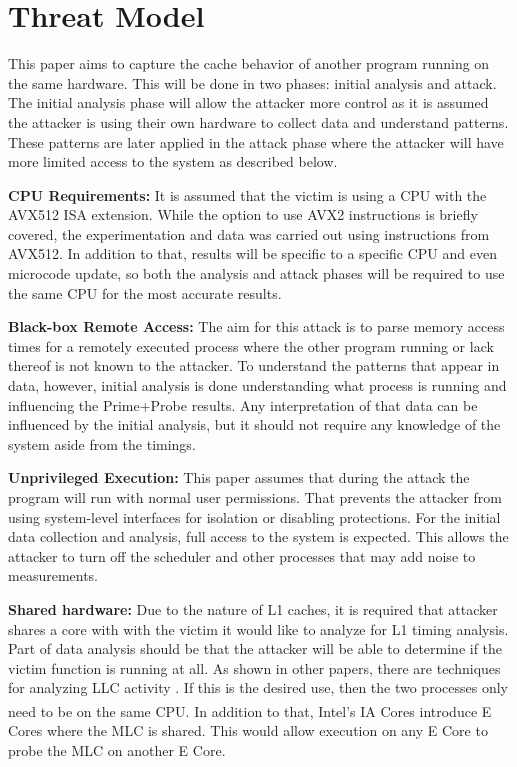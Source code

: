 \documentclass[article]{IEEEtran}
\begin{document}
\section{Threat Model}

This paper aims to capture the cache behavior of another program running on the same hardware. This will be done in two phases: initial analysis and attack. The initial analysis phase will allow the attacker more control as it is assumed the attacker is using their own hardware to collect data and understand patterns. These patterns are later applied in the attack phase where the attacker will have more limited access to the system as described below.

\textbf{CPU Requirements:} It is assumed that the victim is using a CPU with the AVX512 ISA extension. While the option to use AVX2 instructions is briefly covered, the experimentation and data was carried out using instructions from AVX512. In addition to that, results will be specific to a specific CPU and even microcode update, so both the analysis and attack phases will be required to use the same CPU for the most accurate results. 

\textbf{Black-box Remote Access:} The aim for this attack is to parse memory access times for a remotely executed process where the other program running or lack thereof is not known to the attacker. To understand the patterns that appear in data, however, initial analysis is done understanding what process is running and influencing the Prime+Probe results. Any interpretation of that data can be influenced by the initial analysis, but it should not require any knowledge of the system aside from the timings.

\textbf{Unprivileged Execution:} This paper assumes that during the attack the program will run with normal user permissions. That prevents the attacker from using system-level interfaces for isolation or disabling protections. For the initial data collection and analysis, full access to the system is expected. This allows the attacker to turn off the scheduler and other processes that may add noise to measurements.

\textbf{Shared hardware:} Due to the nature of L1 caches, it is required that attacker shares a core with with the victim it would like to analyze for L1 timing analysis. Part of data analysis should be that the attacker will be able to determine if the victim function is running at all. As shown in other papers, there are techniques for analyzing LLC activity \cite{7163050}. If this is the desired use, then the two processes only need to be on the same CPU. In addition to that, Intel\textsuperscript{\tiny\textregistered}'s IA Cores introduce E Cores where the MLC is shared. This would allow execution on any E Core to probe the MLC on another E Core\cite{ia-cores}.
\end{document}
